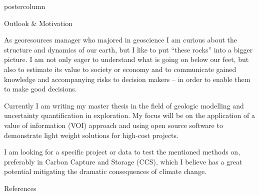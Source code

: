 \documentclass{beamer}
\begin{document}
\begin{frame}
\begin{columns}
\begin{column}{.618\textwidth}
\begin{beamercolorbox}[center]{postercolumn}
\begin{minipage}{.98\textwidth}
{\begin{myblock}{Outlook \& Motivation}



\end{myblock}\vfill					
	
					As georesources manager who majored in geoscience I am curious about the structure and dynamics of our earth, but I like to put “these rocks” into a bigger picture. I am not only eager to understand what is going on below our feet, but also to estimate its value to society or economy and to communicate gained knowledge and accompanying risks to decision makers – in order to enable them to make good decisions.

Currently I am writing my master thesis in the field of geologic modelling and uncertainty quantification in exploration. My focus will be on the application of a value of information (VOI) approach and using open source software to demonstrate light weight solutions for high-cost projects.

I am looking for a specific project or data to test the mentioned methods on, preferably in Carbon Capture and Storage (CCS), which I believe has a great potential mitigating the dramatic consequences of climate change.
					
\begin{myblock}{References}
	\footnotesize
	
\end{myblock}


		}\end{minipage}\end{beamercolorbox}
	\end{column}
\end{columns}
\end{frame}
\end{document}
